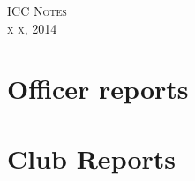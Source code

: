 \documentclass{article}
\begin{document}
\begin{center}
{\Large\scshape ICC Notes}\\[0.2cm]
{\large\scshape x x, 2014}\\[0.4cm]
\end{center}

\section{Officer reports}
\begin{itemize}
\end{itemize}

\section{Club Reports}
\begin{description}
\end{description}
\end{document}
